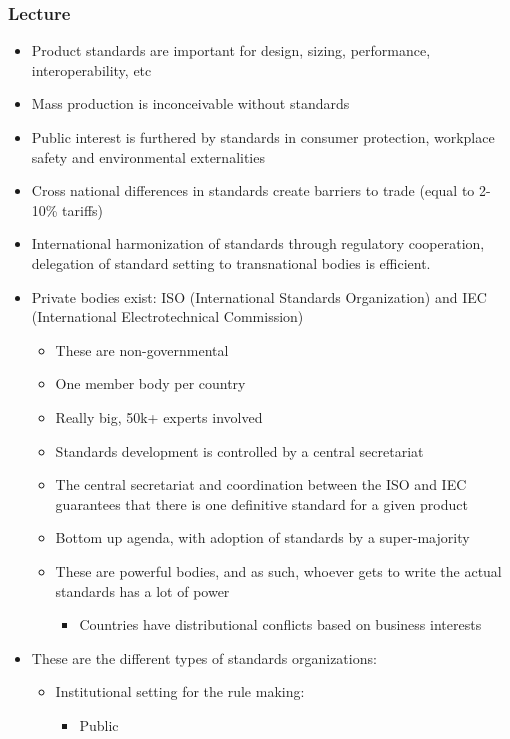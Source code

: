 \documentclass[11pt]{article}
\begin{document}
\subsubsection{Lecture}
\label{sec:org3a7266f}
\begin{itemize}
\item Product standards are important for design, sizing, performance,
interoperability, etc
\item Mass production is inconceivable without standards
\item Public interest is furthered by standards in consumer protection, workplace
safety and environmental externalities
\item Cross national differences in standards create barriers to trade (equal to
2-10\% tariffs)
\item International harmonization of standards through regulatory cooperation,
delegation of standard setting to transnational bodies is efficient.
\item Private bodies exist: ISO (International Standards Organization) and IEC
(International Electrotechnical Commission)
\begin{itemize}
\item These are non-governmental
\item One member body per country
\item Really big, 50k+ experts involved
\item Standards development is controlled by a central secretariat
\item The central secretariat and coordination between the ISO and IEC guarantees
that there is one definitive standard for a given product
\item Bottom up agenda, with adoption of standards by a super-majority
\item These are powerful bodies, and as such, whoever gets to write the actual
standards has a lot of power
\begin{itemize}
\item Countries have distributional conflicts based on business interests
\end{itemize}
\end{itemize}
\item These are the different types of standards organizations:
\begin{itemize}
\item Institutional setting for the rule making:
\begin{itemize}
\item Public

\end{itemize}
\end{itemize}
\end{itemize}
\end{document}
